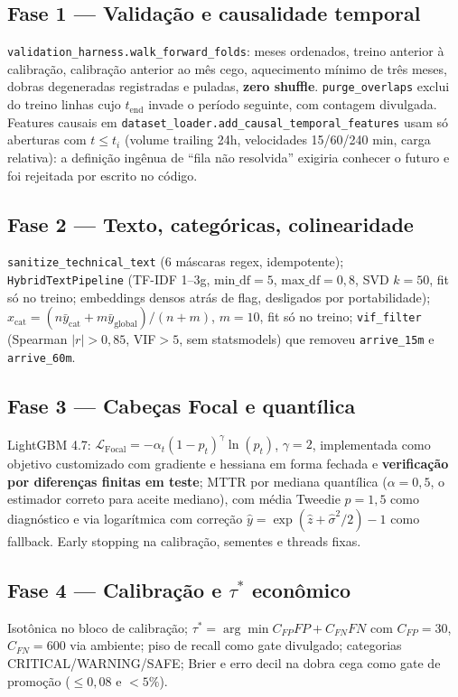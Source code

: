 \documentclass[11pt,a4paper]{article}
\begin{document}
\subsection{Fase 1 — Validação e causalidade temporal}
\texttt{validation\_harness.walk\_forward\_folds}: meses ordenados, treino
anterior à calibração, calibração anterior ao mês cego, aquecimento mínimo de
três meses, dobras degeneradas registradas e puladas, \textbf{zero shuffle}.
\texttt{purge\_overlaps} exclui do treino linhas cujo $t_{\text{end}}$ invade o
período seguinte, com contagem divulgada. Features causais em
\texttt{dataset\_loader.add\_causal\_temporal\_features} usam só aberturas com
$t\le t_i$ (volume trailing 24h, velocidades 15/60/240 min, carga relativa):
a definição ingênua de ``fila não resolvida'' exigiria conhecer o futuro e foi
rejeitada por escrito no código.

\subsection{Fase 2 — Texto, categóricas, colinearidade}
\texttt{sanitize\_technical\_text} (6 máscaras regex, idempotente);
\texttt{HybridTextPipeline} (TF-IDF 1--3g, $\mathrm{min\_df}=5$,
$\mathrm{max\_df}=0{,}8$, SVD $k=50$, fit só no treino; embeddings densos atrás
de flag, desligados por portabilidade);
$\hat{x}_{\text{cat}}=(n\bar{y}_{\text{cat}}+m\bar{y}_{\text{global}})/(n+m)$,
$m=10$, fit só no treino; \texttt{vif\_filter} (Spearman $|r|>0{,}85$, VIF$>5$,
sem statsmodels) que removeu \texttt{arrive\_15m} e \texttt{arrive\_60m}.

\subsection{Fase 3 — Cabeças Focal e quantílica}
LightGBM 4.7: $\mathcal{L}_{\text{Focal}}=-\alpha_t(1-p_t)^\gamma\ln(p_t)$,
$\gamma=2$, implementada como objetivo customizado com gradiente e hessiana em
forma fechada e \textbf{verificação por diferenças finitas em teste}; MTTR por
mediana quantílica ($\alpha=0{,}5$, o estimador correto para aceite mediano),
com média Tweedie $p=1{,}5$ como diagnóstico e via logarítmica com correção
$\hat{y}=\exp(\hat{z}+\hat{\sigma}^2/2)-1$ como fallback. Early stopping na
calibração, sementes e threads fixas.

\subsection{Fase 4 — Calibração e $\tau^*$ econômico}
Isotônica no bloco de calibração; $\tau^*=\arg\min C_{FP}FP+C_{FN}FN$ com
$C_{FP}=30$, $C_{FN}=600$ via ambiente; piso de recall como gate divulgado;
categorias CRITICAL/WARNING/SAFE; Brier e erro decil na dobra cega como gate
de promoção ($\le0{,}08$ e $<5\%$).
\end{document}
